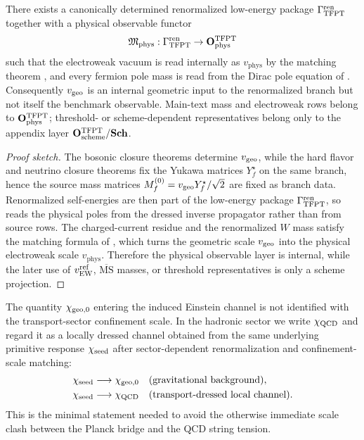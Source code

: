 \begin{theorem}
\label{thm:pole-level-readout}
There exists a canonically determined renormalized low-energy package $\Gamma_{\mathrm{TFPT}}^{\mathrm{ren}}$ together with a
physical observable functor
\[
\mathfrak M_{\mathrm{phys}}:\Gamma_{\mathrm{TFPT}}^{\mathrm{ren}}\to\mathbf O_{\mathrm{phys}}^{\mathrm{TFPT}}
\]
such that the electroweak vacuum is read internally as $v_{\mathrm{phys}}$ by the matching theorem
, and every fermion pole mass is read from the Dirac
pole equation of .
Consequently $v_{\mathrm{geo}}$ is an internal geometric input to the renormalized branch but not itself the
benchmark observable. Main-text mass and electroweak rows belong to $\mathbf O_{\mathrm{phys}}^{\mathrm{TFPT}}$; threshold- or
scheme-dependent representatives belong only to the appendix layer $\mathbf O_{\mathrm{scheme}}^{\mathrm{TFPT}}/\mathbf{Sch}$.
\end{theorem}

\begin{proof}[Proof sketch]
The bosonic closure theorems determine $v_{\mathrm{geo}}$, while the hard flavor and neutrino closure theorems
fix the Yukawa matrices $Y_f^\star$ on the same branch, hence the source mass matrices
$M_f^{(0)}=v_{\mathrm{geo}} Y_f^\star/\sqrt2$ are fixed as branch data. Renormalized self-energies are then
part of the low-energy package $\Gamma_{\mathrm{TFPT}}^{\mathrm{ren}}$, so  reads the physical
poles from the dressed inverse propagator rather than from source rows. The charged-current residue
and the renormalized $W$ mass satisfy the matching formula of
, which turns the geometric scale $v_{\mathrm{geo}}$ into the
physical electroweak scale $v_{\mathrm{phys}}$. Therefore the physical observable layer is
internal, while the later use of $v_{\mathrm{EW}}^{\mathrm{ref}}$, $\overline{\mathrm{MS}}$ masses, or threshold
representatives is only a scheme projection.
\end{proof}

\begin{remark}
The quantity $\chi_{\mathrm{geo},0}$ entering the induced Einstein channel is not identified with the transport-sector confinement scale. In the hadronic sector we write $\chi_{\mathrm{QCD}}$ and regard it as a locally dressed channel obtained from the same underlying primitive response $\chi_{\mathrm{seed}}$ after sector-dependent renormalization and confinement-scale matching:
\[
\begin{aligned}
\chi_{\mathrm{seed}} &\longrightarrow \chi_{\mathrm{geo},0}
&& \text{(gravitational background)},
\\
\chi_{\mathrm{seed}} &\longrightarrow \chi_{\mathrm{QCD}}
&& \text{(transport-dressed local channel)}.
\end{aligned}
\]
This is the minimal statement needed to avoid the otherwise immediate scale clash between the Planck bridge and the QCD string tension.
\end{remark}

